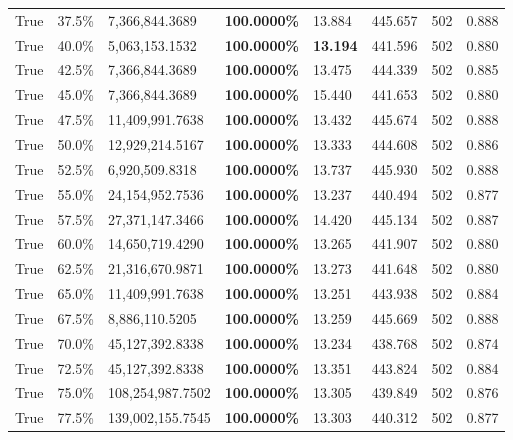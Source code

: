 \begin{table}[H]
\begin{tabular}{lllrllll}
\cline{1-8}
True & 37.5\% & 7,366,844.3689 & \bfseries \color{red} 100.0000\% & 13.884 & 445.657 & 502 & 0.888 \\
\cline{1-8}
True & 40.0\% & 5,063,153.1532 & \bfseries \color{red} 100.0000\% & \bfseries \color{red} 13.194 & 441.596 & 502 & 0.880 \\
\cline{1-8}
True & 42.5\% & 7,366,844.3689 & \bfseries \color{red} 100.0000\% & 13.475 & 444.339 & 502 & 0.885 \\
\cline{1-8}
True & 45.0\% & 7,366,844.3689 & \bfseries \color{red} 100.0000\% & 15.440 & 441.653 & 502 & 0.880 \\
\cline{1-8}
True & 47.5\% & 11,409,991.7638 & \bfseries \color{red} 100.0000\% & 13.432 & 445.674 & 502 & 0.888 \\
\cline{1-8}
True & 50.0\% & 12,929,214.5167 & \bfseries \color{red} 100.0000\% & 13.333 & 444.608 & 502 & 0.886 \\
\cline{1-8}
True & 52.5\% & 6,920,509.8318 & \bfseries \color{red} 100.0000\% & 13.737 & 445.930 & 502 & 0.888 \\
\cline{1-8}
True & 55.0\% & 24,154,952.7536 & \bfseries \color{red} 100.0000\% & 13.237 & 440.494 & 502 & 0.877 \\
\cline{1-8}
True & 57.5\% & 27,371,147.3466 & \bfseries \color{red} 100.0000\% & 14.420 & 445.134 & 502 & 0.887 \\
\cline{1-8}
True & 60.0\% & 14,650,719.4290 & \bfseries \color{red} 100.0000\% & 13.265 & 441.907 & 502 & 0.880 \\
\cline{1-8}
True & 62.5\% & 21,316,670.9871 & \bfseries \color{red} 100.0000\% & 13.273 & 441.648 & 502 & 0.880 \\
\cline{1-8}
True & 65.0\% & 11,409,991.7638 & \bfseries \color{red} 100.0000\% & 13.251 & 443.938 & 502 & 0.884 \\
\cline{1-8}
True & 67.5\% & 8,886,110.5205 & \bfseries \color{red} 100.0000\% & 13.259 & 445.669 & 502 & 0.888 \\
\cline{1-8}
True & 70.0\% & 45,127,392.8338 & \bfseries \color{red} 100.0000\% & 13.234 & 438.768 & 502 & 0.874 \\
\cline{1-8}
True & 72.5\% & 45,127,392.8338 & \bfseries \color{red} 100.0000\% & 13.351 & 443.824 & 502 & 0.884 \\
\cline{1-8}
True & 75.0\% & 108,254,987.7502 & \bfseries \color{red} 100.0000\% & 13.305 & 439.849 & 502 & 0.876 \\
\cline{1-8}
True & 77.5\% & 139,002,155.7545 & \bfseries \color{red} 100.0000\% & 13.303 & 440.312 & 502 & 0.877 \\

\end{tabular}
\end{table}
